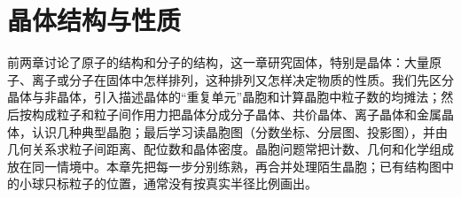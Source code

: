 \chapter{晶体结构与性质}

\newcommand{\ceightcube}[1][black]{%
 \draw[#1] (0,0,0)--(1,0,0)--(1,0,1)--(0,0,1)--cycle;
 \draw[#1] (1,0,0)--(1,1,0)--(1,1,1)--(1,0,1);
 \draw[#1] (0,0,1)--(0,1,1)--(1,1,1);
 \draw[#1,dashed] (0,0,0)--(0,1,0)--(1,1,0);
 \draw[#1,dashed] (0,1,0)--(0,1,1);}
\newcommand{\ceightball}[3][0.13]{\shade[ball color=#2] (#3) circle (#1cm);}
\newcommand{\ceightV}{{0,0,0},{1,0,0},{0,1,0},{1,1,0},{0,0,1},{1,0,1},{0,1,1},{1,1,1}}
\newcommand{\ceightF}{{0.5,0.5,0},{0.5,0.5,1},{0.5,0,0.5},{0.5,1,0.5},{0,0.5,0.5},{1,0.5,0.5}}
\newcommand{\ceightE}{{0.5,0,0},{0.5,1,0},{0.5,0,1},{0.5,1,1},{0,0.5,0},{1,0.5,0},{0,0.5,1},{1,0.5,1},{0,0,0.5},{1,0,0.5},{0,1,0.5},{1,1,0.5}}
\newcommand{\ceightT}{{0.25,0.25,0.25},{0.75,0.75,0.25},{0.75,0.25,0.75},{0.25,0.75,0.75}}
\newcommand{\ceightTT}{{0.75,0.25,0.25},{0.25,0.75,0.25},{0.25,0.25,0.75},{0.75,0.75,0.75}}
\newcommand{\ceightcotwo}[2]{%
 \draw[line width=1.3pt,black!55] ($(#1)-(#2)$)--($(#1)+(#2)$);
 \shade[ball color=warnred!80] ($(#1)-(#2)$) circle (0.055cm);
 \shade[ball color=warnred!80] ($(#1)+(#2)$) circle (0.055cm);
 \shade[ball color=black!60] (#1) circle (0.06cm);}
\newcommand{\ceighttu}[2]{\par\noindent\begin{minipage}{\linewidth}\tu{#1}{#2}\end{minipage}\par}
\newcommand{\ceightleg}[4][0.1]{\shade[ball color=#3] (#2) circle (#1cm); \node[right,font=\scriptsize] at (#2) {\hspace{0.6ex}#4};}

前两章讨论了原子的结构和分子的结构，这一章研究固体，特别是晶体：大量原子、离子或分子在固体中怎样排列，这种排列又怎样决定物质的性质。我们先区分晶体与非晶体，引入描述晶体的“重复单元”晶胞和计算晶胞中粒子数的均摊法；然后按构成粒子和粒子间作用力把晶体分成分子晶体、共价晶体、离子晶体和金属晶体，认识几种典型晶胞；最后学习读晶胞图（分数坐标、分层图、投影图），并由几何关系求粒子间距离、配位数和晶体密度。晶胞问题常把计数、几何和化学组成放在同一情境中。本章先把每一步分别练熟，再合并处理陌生晶胞；已有结构图中的小球只标粒子的位置，通常没有按真实半径比例画出。

